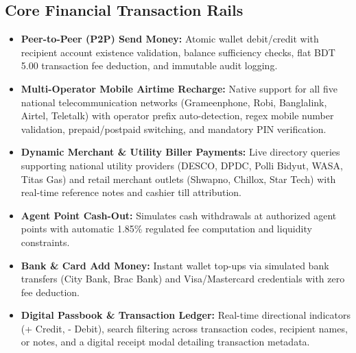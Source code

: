 \documentclass[10.5pt,a4paper]{article}
\begin{document}
\subsection{Core Financial Transaction Rails}
\begin{itemize}[leftmargin=*]
    \item \textbf{Peer-to-Peer (P2P) Send Money:} Atomic wallet debit/credit with recipient account existence validation, balance sufficiency checks, flat BDT 5.00 transaction fee deduction, and immutable audit logging.
    \item \textbf{Multi-Operator Mobile Airtime Recharge:} Native support for all five national telecommunication networks (Grameenphone, Robi, Banglalink, Airtel, Teletalk) with operator prefix auto-detection, regex mobile number validation, prepaid/postpaid switching, and mandatory PIN verification.
    \item \textbf{Dynamic Merchant \& Utility Biller Payments:} Live directory queries supporting national utility providers (DESCO, DPDC, Polli Bidyut, WASA, Titas Gas) and retail merchant outlets (Shwapno, Chillox, Star Tech) with real-time reference notes and cashier till attribution.
    \item \textbf{Agent Point Cash-Out:} Simulates cash withdrawals at authorized agent points with automatic 1.85\% regulated fee computation and liquidity constraints.
    \item \textbf{Bank \& Card Add Money:} Instant wallet top-ups via simulated bank transfers (City Bank, Brac Bank) and Visa/Mastercard credentials with zero fee deduction.
    \item \textbf{Digital Passbook \& Transaction Ledger:} Real-time directional indicators (+ Credit, - Debit), search filtering across transaction codes, recipient names, or notes, and a digital receipt modal detailing transaction metadata.
\end{itemize}
\end{document}
